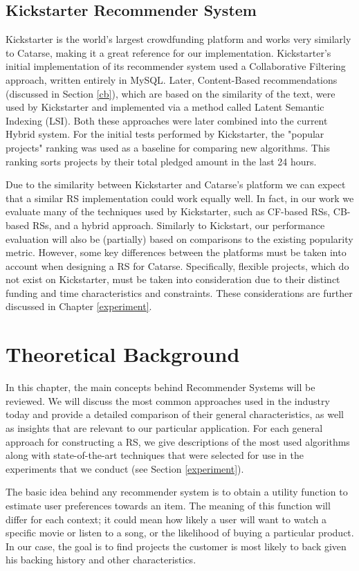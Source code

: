 \documentclass[cic,tc,english]{iiufrgs}
\begin{document}
\section{Kickstarter Recommender System}
Kickstarter is the world's largest crowdfunding platform and works very similarly to Catarse, making it a great reference for our implementation. Kickstarter's initial implementation of its recommender system used a Collaborative Filtering approach, written entirely in MySQL. Later, Content-Based recommendations (discussed in Section \ref{cb}), which are based on the similarity of the text, were used by Kickstarter and implemented via a method called Latent Semantic Indexing (LSI). Both these approaches were later combined into the current Hybrid system. For the initial tests performed by Kickstarter, the "popular projects" ranking was used as a baseline for comparing new algorithms. This ranking sorts projects by their total pledged amount in the last 24 hours.

Due to the similarity between Kickstarter and Catarse's platform we can expect that a similar RS implementation could work equally well. In fact, in our work we evaluate many of the techniques used by Kickstarter, such as CF-based RSs, CB-based RSs, and a hybrid approach. Similarly to Kickstart, our performance evaluation will also be (partially) based on comparisons to the existing popularity metric. However, some key differences between the platforms must be taken into account when designing a RS for Catarse. Specifically, flexible projects, which do not exist on Kickstarter, must be taken into consideration due to their distinct funding and time characteristics and constraints. These considerations are further discussed in Chapter \ref{experiment}.

\chapter{Theoretical Background} \label{background}
In this chapter, the main concepts behind Recommender Systems will be reviewed. We will discuss the most common approaches used in the industry today and provide a detailed comparison of their general characteristics, as well as insights that are relevant to our particular application. For each general approach for constructing a RS, we give descriptions of the most used algorithms along with state-of-the-art techniques that were selected for use in the experiments that we conduct (see Section \ref{experiment}).

The basic idea behind any recommender system is to obtain a utility function to estimate user preferences towards an item. The meaning of this function will differ for each context; it could mean how likely a user will want to watch a specific movie or listen to a song, or the likelihood of buying a particular product. In our case, the goal is to find projects the customer is most likely to back given his backing history and other characteristics. 
\end{document}
